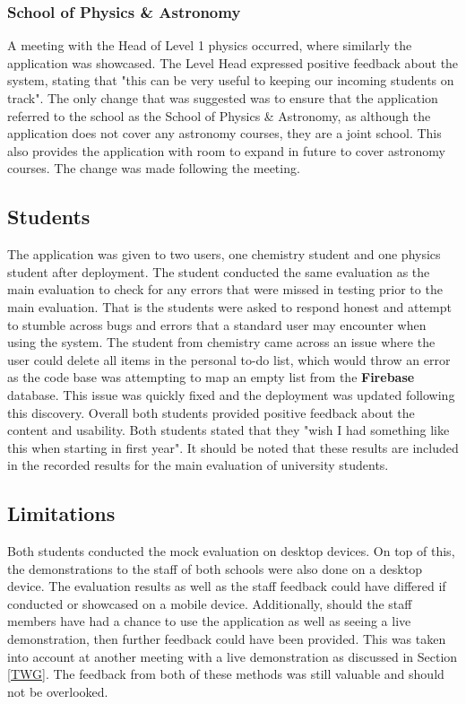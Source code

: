 \documentclass{l4proj}
\begin{document}
\subsubsection{School of Physics \& Astronomy}
A meeting with the Head of Level 1 physics occurred,  where similarly the application was showcased. The Level Head expressed positive feedback about the system,  stating that "this can be very useful to keeping our incoming students on track". The only change that was suggested was to ensure that the application referred to the school as the School of Physics \& Astronomy,  as although the application does not cover any astronomy courses,  they are a joint school. This also provides the application with room to expand in future to cover astronomy courses. The change was made following the meeting.

\subsection{Students}
The application was given to two users,  one chemistry student and one physics student after deployment. The student conducted the same evaluation as the main evaluation to check for any errors that were missed in testing prior to the main evaluation. That is the students were asked to respond honest and attempt to stumble across bugs and errors that a standard user may encounter when using the system. The student from chemistry came across an issue where the user could delete all items in the personal to-do list,  which would throw an error as the code base was attempting to map an empty list from the \textbf{Firebase} database. This issue was quickly fixed and the deployment was updated following this discovery. Overall both students provided positive feedback about the content and usability. Both students stated that they "wish I had something like this when starting in first year". It should be noted that these results are included in the recorded results for the main evaluation of university students.

\subsection{Limitations}
Both students conducted the mock evaluation on desktop devices. On top of this,  the demonstrations to the staff of both schools were also done on a desktop device. The evaluation results as well as the staff feedback could have differed if conducted or showcased on a mobile device. Additionally,  should the staff members have had a chance to use the application as well as seeing a live demonstration,  then further feedback could have been provided. This was taken into account at another meeting with a live demonstration as discussed in Section \ref{TWG}. The feedback from both of these methods was still valuable and should not be overlooked.
\end{document}
